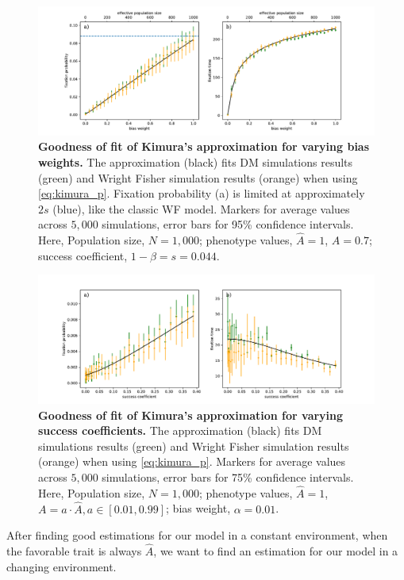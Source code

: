 \documentclass[12pt]{extarticle}
\begin{document}
\begin{figure}[h]
    \includegraphics[width=\linewidth]{../figures/binary/kimura_var_alpha.pdf}
  \caption{\textbf{Goodness of fit of Kimura's approximation for varying bias weights.}
  The approximation (black) fits DM simulations results (green) and Wright Fisher simulation results (orange) when using \cref{eq:kimura_p}.
  Fixation probability (a) is limited at approximately $2s$ (blue), like the classic WF model.
  Markers for average values across $5,000$ simulations, error bars for 95\% confidence intervals.
   Here, Population size, $N=1,000$; phenotype values, $\hat{A}=1$, $A=0.7$; success coefficient, $1-\beta=s=0.044$.}
  \label{fig:var_alpha}
\end{figure}

\begin{figure}[h]
    \includegraphics[width=\linewidth]{../figures/binary/kimura_var_beta.pdf}
  \caption{\textbf{Goodness of fit of Kimura's approximation for varying success coefficients.}
   The approximation (black) fits DM simulations results (green) and Wright Fisher simulation results (orange) when using \cref{eq:kimura_p}.
  Markers for average values across $5,000$ simulations, error bars for 75\% confidence intervals.
 Here, Population size, $N=1,000$; phenotype values, $\hat{A}=1$, $A=a\cdot \hat{A}, a \in [0.01,0.99]$; bias weight, $\alpha=0.01$.}
  \label{fig:var_beta}
\end{figure}

After finding good estimations for our model in a constant environment, when the favorable trait is always $\hat{A}$, we want to find an estimation for our model in a changing environment.
\end{document}
